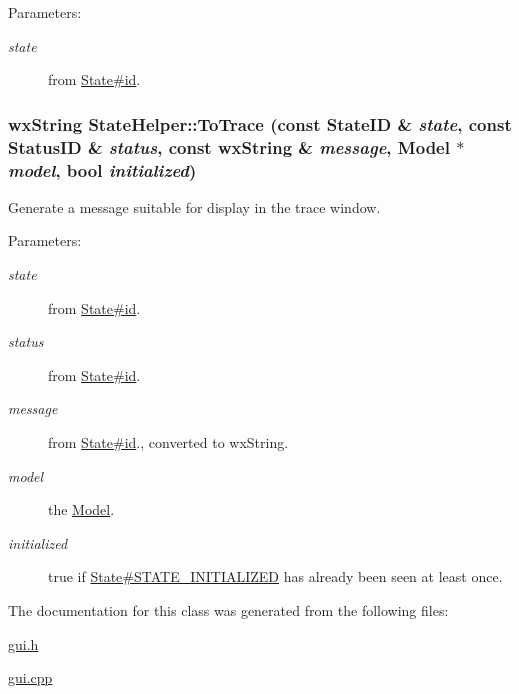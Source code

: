 \begin{Desc}
\item[Parameters:]
\begin{description}
\item[{\em state}]from \hyperlink{classState_f747db9527dfb6ea0a58fe7bfeb3ac80}{State\#id}. \end{description}
\end{Desc}
\hypertarget{classStateHelper_c1c01103481e034cdcd4c679cf3bb45e}{
\subsubsection[{ToTrace}]{\setlength{\rightskip}{0pt plus 5cm}wxString StateHelper::ToTrace (const {\bf StateID} \& {\em state}, \/  const {\bf StatusID} \& {\em status}, \/  const wxString \& {\em message}, \/  {\bf Model} $\ast$ {\em model}, \/  bool {\em initialized})}}
\label{classStateHelper_c1c01103481e034cdcd4c679cf3bb45e}


Generate a message suitable for display in the trace window. 

\begin{Desc}
\item[Parameters:]
\begin{description}
\item[{\em state}]from \hyperlink{classState_f747db9527dfb6ea0a58fe7bfeb3ac80}{State\#id}. \item[{\em status}]from \hyperlink{classState_f747db9527dfb6ea0a58fe7bfeb3ac80}{State\#id}. \item[{\em message}]from \hyperlink{classState_f747db9527dfb6ea0a58fe7bfeb3ac80}{State\#id}., converted to wxString. \item[{\em model}]the \hyperlink{classModel}{Model}. \item[{\em initialized}]true if \hyperlink{state_8h_2c309f64131cbfdae6d95e6591f208e6033f1b9c62140635eb6f0e3035a72c34}{State\#STATE\_\-INITIALIZED} has already been seen at least once. \end{description}
\end{Desc}


The documentation for this class was generated from the following files:\begin{CompactItemize}
\item 
\hyperlink{gui_8h}{gui.h}\item 
\hyperlink{gui_8cpp}{gui.cpp}\end{CompactItemize}
